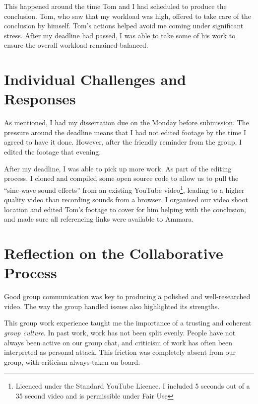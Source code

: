 \documentclass[paper=a4,fontsize=16pt]{article}
\begin{document}
This happened around the time Tom and I had scheduled to produce the
conclusion. Tom, who saw that my workload was high, offered to take care of
the conclusion by himself. Tom's actions helped avoid me coming under
significant stress. After my deadline had passed, I was able to take some of
his work to ensure the overall workload remained balanced.

\section{Individual Challenges and Responses}

As mentioned, I had my dissertation due on the Monday before submission. The pressure
around the deadline means that I had not edited footage by the time I  
agreed to have it done. However, after the friendly reminder from the group,
I edited the footage that evening.

After my deadline, I was able to pick up more work. As part of the editing
process, I cloned and compiled some open source code to allow us to pull the
``sine-wave sound effects'' from an existing YouTube video\footnote{Licenced
under the Standard YouTube Licence. I included 5 seconds out of a 35 second
video and is permissible under Fair Use}, leading to a higher quality video
than recording sounds from a browser. I organised our video shoot location
and edited Tom's footage to cover for him helping with the conclusion, and
made sure all referencing links were available to Ammara.

\section{Reflection on the Collaborative Process}

Good group communication was key to producing a polished and well-researched video. 
The way the group handled issues also highlighted its strengths.

This group work experience taught me the importance of a trusting and coherent
\emph{group culture}. In past work, work has not been split evenly. People
have not always been active on our group chat, and criticism of work has
often been interpreted as personal attack. This friction was completely
absent from our group, with criticism always taken on board.
\end{document}
